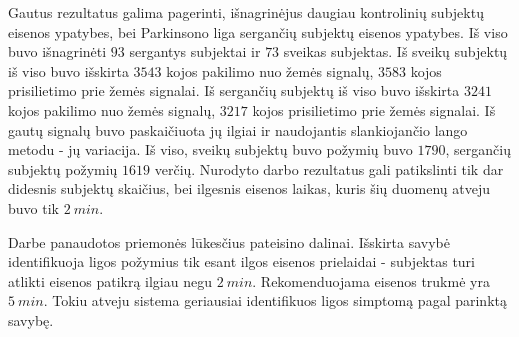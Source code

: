 \documentclass[]{vgtuef}
\begin{document}
Gautus rezultatus galima pagerinti, išnagrinėjus daugiau kontrolinių subjektų eisenos ypatybes, bei Parkinsono liga sergančių subjektų eisenos ypatybes. Iš viso buvo išnagrinėti $93$ sergantys subjektai ir $73$ sveikas subjektas. Iš sveikų subjektų iš viso buvo išskirta $3543$ kojos pakilimo nuo žemės signalų, $3583$ kojos prisilietimo prie žemės signalai. Iš sergančių subjektų iš viso buvo išskirta $3241$ kojos pakilimo nuo žemės signalų, $3217$ kojos prisilietimo prie žemės signalai. Iš gautų signalų buvo paskaičiuota jų ilgiai ir naudojantis slankiojančio lango metodu - jų variacija. Iš viso, sveikų subjektų buvo požymių buvo $1790$, sergančių subjektų požymių $1619$ verčių. Nurodyto darbo rezultatus gali patikslinti tik dar didesnis subjektų skaičius, bei ilgesnis eisenos laikas, kuris šių duomenų atveju buvo tik $2~min$.


Darbe panaudotos priemonės lūkesčius pateisino dalinai. Išskirta savybė identifikuoja ligos požymius tik esant ilgos eisenos prielaidai - subjektas turi atlikti eisenos patikrą ilgiau negu $2~min$. Rekomenduojama eisenos trukmė yra $5~min$. Tokiu atveju sistema geriausiai identifikuos ligos simptomą pagal parinktą savybę. %




\end{document}
